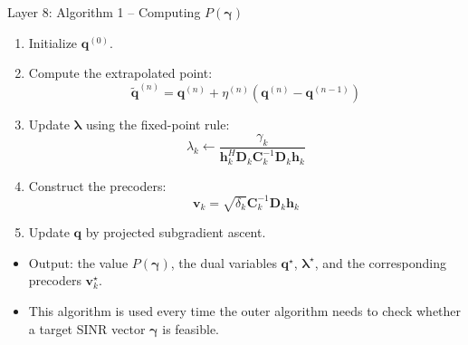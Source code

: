 \documentclass{beamer}
\begin{document}
\begin{frame}{Layer 8: Algorithm 1 -- Computing \(P(\boldsymbol{\gamma})\)}
\scriptsize

\begin{enumerate}
    \item Initialize \(\mathbf{q}^{(0)}\).

    \item Compute the extrapolated point:
    \[
        \widetilde{\mathbf{q}}^{(n)}
        =
        \mathbf{q}^{(n)}
        +
        \eta^{(n)}
        \left(\mathbf{q}^{(n)}-\mathbf{q}^{(n-1)}\right)
    \]

    \item Update \(\boldsymbol{\lambda}\) using the fixed-point rule:
    \[
        \lambda_k
        \leftarrow
        \frac{\gamma_k}
        {\mathbf{h}_k^H\mathbf{D}_k\mathbf{C}_k^{-1}\mathbf{D}_k\mathbf{h}_k}
    \]

    \item Construct the precoders:
    \[
        \mathbf{v}_k
        =
        \sqrt{\delta_k}
        \mathbf{C}_k^{-1}
        \mathbf{D}_k\mathbf{h}_k
    \]

    \item Update \(\mathbf{q}\) by projected subgradient ascent.
\end{enumerate}

\begin{itemize}
    \item Output: the value \(P(\boldsymbol{\gamma})\), the dual variables \(\mathbf{q}^{\star}\), \(\boldsymbol{\lambda}^{\star}\), and the corresponding precoders \(\mathbf{v}_k^{\star}\).
    \item This algorithm is used every time the outer algorithm needs to check whether a target SINR vector \(\boldsymbol{\gamma}\) is feasible.
\end{itemize}

\end{frame}
\end{document}

